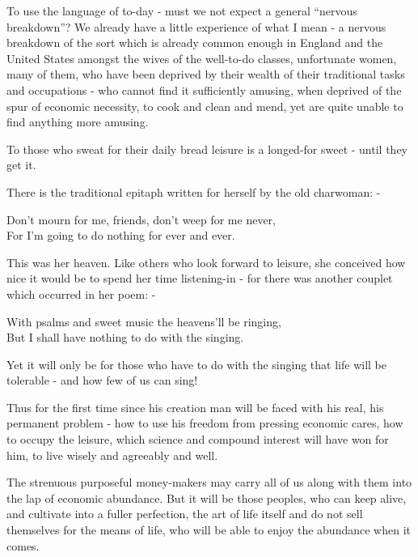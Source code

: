 To use the language of to-day - must we not expect a general “nervous breakdown”? We already have a little experience of what I mean - a nervous breakdown of the sort which is already common enough in England and the United States amongst the wives of the well-to-do classes, unfortunate women, many of them, who have been deprived by their wealth of their traditional tasks and occupations - who cannot find it sufficiently amusing, when deprived of the spur of economic necessity, to cook and clean and mend, yet are quite unable to find anything more amusing.\par

To those who sweat for their daily bread leisure is a longed-for sweet - until they get it.\par

There is the traditional epitaph written for herself by the old charwoman: -\par

\begin{rverse}
Don’t mourn for me, friends, don’t weep for me never, \\
For I’m going to do nothing for ever and ever.
\end{rverse}

This was her heaven. Like others who look forward to leisure, she conceived how nice it would be to spend her time listening-in - for there was another couplet which occurred in her poem: -\par

\begin{rverse}
With psalms and sweet music the heavens’ll be ringing, \\
But I shall have nothing to do with the singing.
\end{rverse}

Yet it will only be for those who have to do with the singing that life will be tolerable - and how few of us can sing!\par

Thus for the first time since his creation man will be faced with his real, his permanent problem - how to use his freedom from pressing economic cares, how to occupy the leisure, which science and compound interest will have won for him, to live wisely and agreeably and well.\par

The strenuous purposeful money-makers may carry all of us along with them into the lap of economic abundance. But it will be those peoples, who can keep alive, and cultivate into a fuller perfection, the art of life itself and do not sell themselves for the means of life, who will be able to enjoy the abundance when it comes.\par

